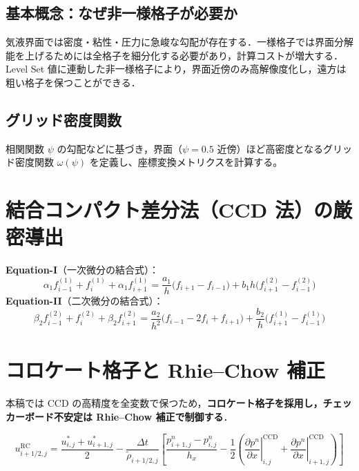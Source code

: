 \documentclass[12pt, a4paper, titlepage, xelatex, ja=standard]{bxjsarticle}
\newcommand{\fp}[1]{f^{(1)}_{#1}}
\newcommand{\fpp}[1]{f^{(2)}_{#1}}
\begin{document}
\subsection{基本概念：なぜ非一様格子が必要か}

気液界面では密度・粘性・圧力に急峻な勾配が存在する．一様格子では界面分解能を上げるためには全格子を細分化する必要があり，計算コストが増大する．Level Set 値に連動した非一様格子により，界面近傍のみ高解像度化し，遠方は粗い格子を保つことができる．

\subsection{グリッド密度関数}

相関関数 $\psi$ の勾配などに基づき，界面（$\psi=0.5$ 近傍）ほど高密度となるグリッド密度関数 $\omega(\psi)$ を定義し、座標変換メトリクスを計算する。


\section{結合コンパクト差分法（CCD 法）の厳密導出}
\label{sec:CCD}

\begin{tcolorbox}[mybox, title={CCD スキームの2方程式}]
\textbf{Equation-I}（一次微分の結合式）：
\begin{equation}
  \alpha_1\fp{i-1} + \fp{i} + \alpha_1\fp{i+1} = \frac{a_1}{h}\bigl(f_{i+1}-f_{i-1}\bigr) + b_1 h\bigl(\fpp{i+1}-\fpp{i-1}\bigr)
\end{equation}
\textbf{Equation-II}（二次微分の結合式）：
\begin{equation}
  \beta_2\fpp{i-1} + \fpp{i} + \beta_2\fpp{i+1} = \frac{a_2}{h^2}\bigl(f_{i-1}-2f_i+f_{i+1}\bigr) + \frac{b_2}{h}\bigl(\fp{i+1}-\fp{i-1}\bigr)
\end{equation}
\end{tcolorbox}


\section{コロケート格子と Rhie--Chow 補正}
\label{sec:collocate}

本稿では CCD の高精度を全変数で保つため，\textbf{コロケート格子を採用し，チェッカーボード不安定は Rhie--Chow 補正で制御する}．
\begin{tcolorbox}[mybox, title={Rhie--Chow 補正速度（セル界面，2次元）}]
\begin{equation}
  u_{i+1/2,j}^{\mathrm{RC}}
  = \frac{u^*_{i,j} + u^*_{i+1,j}}{2}
  - \frac{\Delta t}{\tilde\rho_{i+1/2,j}}
    \!\left[
      \frac{p^n_{i+1,j} - p^n_{i,j}}{h_x}
      - \frac{1}{2}\!\left(
        \left.\frac{\partial p^n}{\partial x}\right|_{i,j}^{\mathrm{CCD}}
        + \left.\frac{\partial p^n}{\partial x}\right|_{i+1,j}^{\mathrm{CCD}}
      \right)
    \right]
  \label{eq:rhie_chow}
\end{equation}
\end{tcolorbox}
\end{document}
